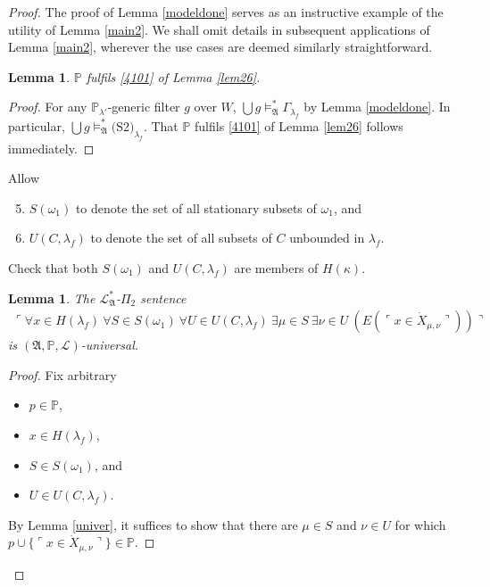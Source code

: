\documentclass[12pt, twoside]{memoir}
\numberwithin{equation}{section}
\newtheorem{lem}[thm]{Lemma}
\theoremstyle{definition}
\theoremstyle{remark}
\theoremstyle{definition}
\theoremstyle{definition}
\theoremstyle{definition}
\theoremstyle{remark}
\begin{document}
\begin{proof}
The proof of Lemma \ref{modeldone} serves as an instructive example of the utility of Lemma \ref{main2}. We shall omit details in subsequent applications of Lemma \ref{main2}, wherever the use cases are deemed similarly straightforward. 

\begin{lem}\label{1done}
$\mathbb{P}$ fulfils \ref{4101} of Lemma \ref{lem26}.
\end{lem}

\begin{proof}
For any $\mathbb{P}_{\lambda'}$-generic filter $g$ over $W$, $\bigcup g \models^*_{\mathfrak{A}} \Gamma_{\lambda_f}$ by Lemma \ref{modeldone}. In particular, $\bigcup g \models^*_{\mathfrak{A}} \text{(S2)}_{\lambda_f}$. That $\mathbb{P}$ fulfils \ref{4101} of Lemma \ref{lem26} follows immediately.
\end{proof}

Allow
\begin{enumerate}[label=(\Alph*)]
    \setcounter{enumi}{4}
    \item $S(\omega_1)$ to denote the set of all stationary subsets of $\omega_1$, and
    \item\label{def423} $U(C, \lambda_f)$ to denote the set of all subsets of $C$ unbounded in $\lambda_f$.
\end{enumerate}
Check that both $S(\omega_1)$ and $U(C, \lambda_f)$ are members of $H(\kappa)$.

\begin{lem}\label{sideuni}
The $\mathcal{L}^*_{\mathfrak{A}}$-$\Pi_2$ sentence 
\begin{align}\label{c9}
    \ulcorner \forall x \in H(\lambda_f) \ \forall S \in S(\omega_1) \ \forall U \in U(C, \lambda_f) \ \exists \mu \in S \ \exists \nu \in U \ (E(\ulcorner x \in \dot{X}_{\mu, \nu} \urcorner)) \urcorner
\end{align} 
is $(\mathfrak{A}, \mathbb{P}, \mathcal{L})$-universal.
\end{lem}

\begin{proof}
Fix arbitrary
\begin{itemize}
    \item $p \in \mathbb{P}$,
    \item $x \in H(\lambda_f)$,
    \item $S \in S(\omega_1)$, and
    \item $U \in U(C, \lambda_f)$.
\end{itemize}
By Lemma \ref{univer}, it suffices to show that there are $\mu \in S$ and $\nu \in U$ for which $p \cup \{\ulcorner x \in \dot{X}_{\mu, \nu} \urcorner\} \in \mathbb{P}$.


\end{proof}
\end{proof}
\end{document}
